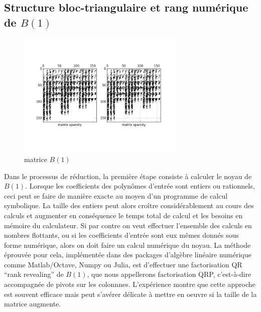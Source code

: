 \documentclass{standalone}
\begin{document}
\subsection{Structure bloc-triangulaire et rang numérique de $B(1)$}

\begin{figure}
  \caption{matrice $B(1)$}
  \label{fig:B1}
  \includegraphics[width=8cm]{../png/bez_diag.png}
\end{figure}
Dans le processus de réduction, la première étape consiste à calculer le noyau de $B(1)$. Lorsque les coefficients des polynômes d'entrée sont entiers ou rationnels, ceci peut se faire de manière exacte au moyen d'un programme de calcul symbolique. La taille des entiers peut alors croître considérablement au cours des calculs et augmenter en conséquence le temps total de calcul et les besoins en mémoire du calculateur. Si par contre on veut effectuer l'ensemble des calculs en nombres flottants, ou si les coefficients d'entrée sont eux mêmes donnés sous forme numérique, alors on doit faire un calcul numérique du noyau. 
La méthode éprouvée pour cela, implémentée dans des packages d'algèbre linéaire numérique comme Matlab/Octave, Numpy ou Julia, est d'effectuer une factorisation QR ``rank revealing'' de $B(1)$, que nous appellerons factorisation QRP, c'est-à-dire accompagnée de pivots sur les colonnnes. L'expérience montre que cette approche est souvent efficace mais peut s'avérer délicate à mettre en oeuvre si la taille de la matrice augmente. 
\end{document}
